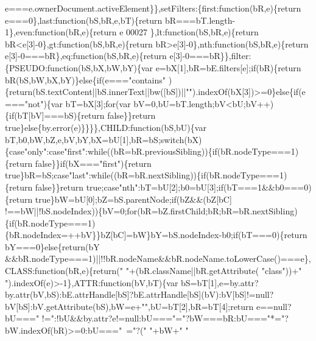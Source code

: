 \begin{DoxyCode}
{       e===e.ownerDocument.activeElement\}\},setFilters:\{first:function(bR,e)\{return e===0\},last:function(bS,bR,e,bT)\{return
       bR===bT.length-1\},even:function(bR,e)\{return e%
00027 \textcolor{stringliteral}{\},lt:function(bS,bR,e)\{return bR<e[3]-0\},gt:function(bS,bR,e)\{return
       bR>e[3]-0\},nth:function(bS,bR,e)\{return e[3]-0===bR\},eq:function(bS,bR,e)\{return e[3]-0===bR\}\},filter:\{PSEUDO:function(bS,bX,bW,bY)\{var
       e=bX[1],bR=bE.filters[e];if(bR)\{return bR(bS,bW,bX,bY)\}else\{if(e==="}contains\textcolor{stringliteral}{"
      )\{return(bS.textContent||bS.innerText||bw([bS])||"}\textcolor{stringliteral}{").indexOf(bX[3])>=0\}else\{if(e==="}not\textcolor{stringliteral}{")\{var bT=bX[3];for(var
       bV=0,bU=bT.length;bV<bU;bV++)\{if(bT[bV]===bS)\{return false\}\}return true\}else\{by.error(e)\}\}\}\},CHILD:function(bS,bU)\{var
       bT,b0,bW,bZ,e,bV,bY,bX=bU[1],bR=bS;switch(bX)\{case"}only\textcolor{stringliteral}{":case"}first\textcolor{stringliteral}{":while((bR=bR.previousSibling))\{if(bR.nodeType===1)\{return
       false\}\}if(bX==="}first\textcolor{stringliteral}{")\{return true\}bR=bS;case"}last\textcolor{stringliteral}{":while((bR=bR.nextSibling))\{if(bR.nodeType===1)\{return
       false\}\}return true;case"}nth\textcolor{stringliteral}{":bT=bU[2];b0=bU[3];if(bT===1&&b0===0)\{return
       true\}bW=bU[0];bZ=bS.parentNode;if(bZ&&(bZ[bC]
      !==bW||!bS.nodeIndex))\{bV=0;for(bR=bZ.firstChild;bR;bR=bR.nextSibling)\{if(bR.nodeType===1)\{bR.nodeIndex=++bV\}\}bZ[bC]=bW\}bY=bS.nodeIndex-b0;if(bT===0)\{return
       bY===0\}else\{return(bY%
      &&bR.nodeType===1)||!!bR.nodeName&&bR.nodeName.toLowerCase()===e\},CLASS:function(bR,e)\{return("} \textcolor{stringliteral}{"+(bR.className||bR.getAttribute(
      "}\textcolor{keyword}{class}\textcolor{stringliteral}{"))+"} \textcolor{stringliteral}{").indexOf(e)>-1\},ATTR:function(bV,bT)\{var
       bS=bT[1],e=by.attr?by.attr(bV,bS):bE.attrHandle[bS]?bE.attrHandle[bS](bV):bV[bS]!=null?bV[bS]:bV.getAttribute(bS),bW=e+"}\textcolor{stringliteral}{",bU=bT[2],bR=bT[4];return e==null?bU==="}
      !=\textcolor{stringliteral}{":!bU&&by.attr?e!=null:bU==="}=\textcolor{stringliteral}{"?bW===bR:bU==="}*=\textcolor{stringliteral}{"?bW.indexOf(bR)>=0:bU==="}~=\textcolor{stringliteral}{"?("} \textcolor{stringliteral}{"+bW+"} \textcolor{stringliteral}{"
}}
\end{DoxyCode}
